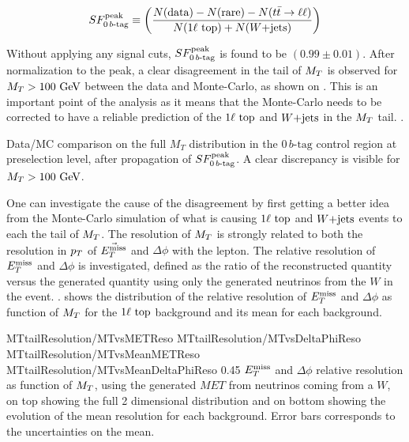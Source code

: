     \begin{equation}
        SF_{0\, b\text{-tag}}^{\text{peak}} \equiv \left( \frac{N(\text{data}) - N(\text{rare}) - N(t\bar{t} \rightarrow \ell \ell)}{N(1\ell~\text{top}) + N(\text{$W$+jets})} \right)
        \label{eq:SF0btagDefinition}
    \end{equation}

    Without applying any signal cuts, $SF_{0\, b\text{-tag}}^{\text{peak}}$ is found to be $(0.99 \pm 0.01)$.
    After normalization to the peak, a clear disagreement in the tail of $M_T$ is observed
    for $M_T > 100 ~\text{GeV}$ between the data and Monte-Carlo, as shown on
    . This is an important point of the analysis as
    it means that the Monte-Carlo needs to be corrected to have a reliable prediction of
    the $1\ell~\text{top}$ and $\text{$W$+jets}$ in the $M_T$ tail. .

                 {Data/MC comparison on the full $M_T$ distribution in the $0\, b\text{-tag}$ control
                 region at preselection level, after propagation of $SF_{0\, b\text{-tag}}^{\text{peak}}$. A clear
                 discrepancy is visible for $M_T > 100 ~\text{GeV}$.}

    One can investigate the cause of the disagreement by first getting a better idea from
    the Monte-Carlo simulation of what is causing $1\ell~\text{top}$ and $\text{$W$+jets}$ events
    to each the tail of $M_T$. The resolution of $M_T$ is strongly related to both the
    resolution in $p_T$ of $\vec{E_T^\text{miss}}$ and $\Delta\phi$ with the lepton. The relative
    resolution of $E_T^\text{miss}$ and $\Delta \phi$ is investigated, defined as the ratio of the
    reconstructed quantity versus the generated quantity using only the generated
    neutrinos from the $W$ in the event. .  shows the distribution of the relative
    resolution of $E_T^\text{miss}$ and $\Delta \phi$ as function of $M_T$ for the $1\ell~\text{top}$
    background and its mean for each background.

                      {MTtailResolution/MTvsMETReso}
                      {MTtailResolution/MTvsDeltaPhiReso}
                      {MTtailResolution/MTvsMeanMETReso}
                      {MTtailResolution/MTvsMeanDeltaPhiReso}
                      {0.45}
                      {$E_T^\text{miss}$ and $\Delta \phi$ relative resolution as function of $M_T$,
                      using the generated $MET$ from neutrinos coming from a $W$, on top
                      showing the full 2 dimensional distribution and on bottom showing
                      the evolution of the mean resolution for each background. Error
                      bars corresponds to the uncertainties on the mean.}

